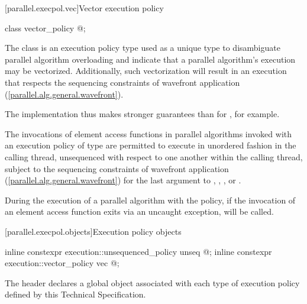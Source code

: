 [parallel.execpol.vec]{Vector execution policy}

\begin{itemdecl}
class vector_policy{ @\unspec@ };
\end{itemdecl}

\pnum
The class  is an execution policy type used as a
unique type to disambiguate parallel algorithm overloading and indicate that a
parallel algorithm's execution may be vectorized. Additionally, such
vectorization will result in an execution that respects the sequencing
constraints of wavefront application
(\hyperref[parallel.alg.general.wavefront]{[parallel.alg.general.wavefront]}).
\begin{note}The implementation thus makes stronger guarantees than for
, for example.\end{note}

\pnum
The invocations of element access functions in parallel algorithms
invoked with an execution policy of type  are permitted to
execute in unordered fashion in the calling thread, unsequenced with respect to
one another within the calling thread, subject to the sequencing constraints of
wavefront application
(\hyperref[parallel.alg.general.wavefront]{[parallel.alg.general.wavefront]})
for the last argument to , ,
, or .

\pnum
During the execution of a parallel algorithm with the
 policy, if the invocation of an
element access function exits via an uncaught exception, 
will be called.

[parallel.execpol.objects]{Execution policy objects}

\begin{itemdecl}
inline constexpr execution::unsequenced_policy unseq{ @\unspec@ };
inline constexpr execution::vector_policy vec{ @\unspec@ };
\end{itemdecl}

\pnum
The header  declares a global object
associated with each type of execution policy defined by this Technical
Specification.

